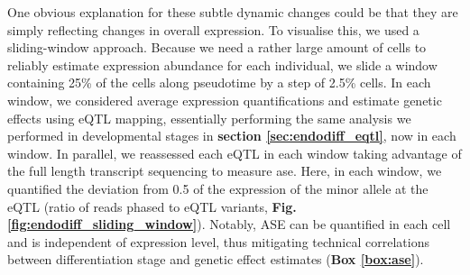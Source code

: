One obvious explanation for these subtle dynamic changes could be that they are simply reflecting changes in overall expression. 
To visualise this,
we used a sliding-window approach. 
Because we need a rather large amount of cells to reliably estimate expression abundance for each individual, we slide a window containing 25\% of the cells along pseudotime by a step of 2.5\% cells.
In each window, we considered average expression quantifications and estimate genetic effects using eQTL mapping, essentially performing the same analysis we performed in developmental stages in \textbf{section \ref{sec:endodiff_eqtl}}, now in each window.
In parallel, we reassessed each eQTL in each window taking advantage of the full length transcript sequencing to measure \gls{ase}.
Here, in each window, we quantified the deviation from 0.5 of the expression of the minor allele at the eQTL (ratio of reads phased to eQTL variants, \textbf{Fig. \ref{fig:endodiff_sliding_window}}). 
Notably, ASE can be quantified in each cell and is independent of expression level, thus mitigating technical correlations between differentiation stage and genetic effect estimates (\textbf{Box \ref{box:ase}}). 


\newpage

